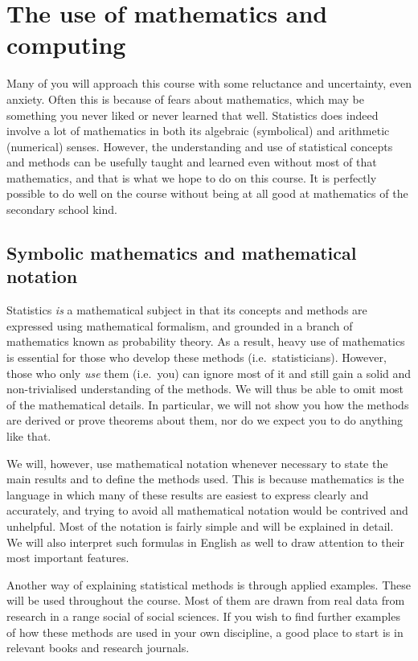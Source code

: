 \documentclass[11pt,a4paper,openany]{book}
\begin{document}
\section{The use of mathematics and computing}\label{s-intro-maths}

Many of you will approach this course with some reluctance and
uncertainty, even anxiety. Often this is because of fears about
mathematics, which may be something you never liked or never learned
that well. Statistics does indeed involve a lot of mathematics in both
its algebraic (symbolical) and arithmetic (numerical) senses. However,
the understanding and use of statistical concepts and methods can be
usefully taught and learned even without most of that mathematics, and
that is what we hope to do on this course. It is perfectly possible to
do well on the course without being at all good at mathematics of the
secondary school kind.

\subsection{Symbolic mathematics and mathematical
notation}\label{symbolic-mathematics-and-mathematical-notation}

Statistics \emph{is} a mathematical subject in that its concepts and
methods are expressed using mathematical formalism, and grounded in a
branch of mathematics known as probability theory. As a result, heavy
use of mathematics is essential for those who develop these methods
(i.e.~statisticians). However, those who only \emph{use} them (i.e.~you)
can ignore most of it and still gain a solid and non-trivialised
understanding of the methods. We will thus be able to omit most of the
mathematical details. In particular, we will not show you how the
methods are derived or prove theorems about them, nor do we expect you
to do anything like that.

We will, however, use mathematical notation whenever necessary to state
the main results and to define the methods used. This is because
mathematics is the language in which many of these results are easiest
to express clearly and accurately, and trying to avoid all mathematical
notation would be contrived and unhelpful. Most of the notation is
fairly simple and will be explained in detail. We will also interpret
such formulas in English as well to draw attention to their most
important features.

Another way of explaining statistical methods is through applied
examples. These will be used throughout the course. Most of them are
drawn from real data from research in a range social of social sciences.
If you wish to find further examples of how these methods are used in
your own discipline, a good place to start is in relevant books and
research journals.
\end{document}
